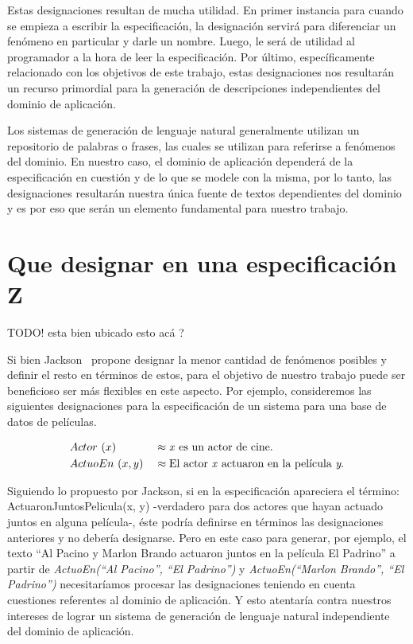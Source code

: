 Estas designaciones resultan de mucha utilidad. En primer instancia para cuando se empieza a escribir la especificación, la designación servirá para diferenciar un fenómeno en particular y darle un nombre. Luego, le será de utilidad al programador a la hora de leer la especificación. Por último, específicamente relacionado con los objetivos de este trabajo, estas designaciones nos resultarán un recurso primordial para la generación de descripciones independientes del dominio de aplicación.

Los sistemas de generación de lenguaje natural generalmente utilizan un repositorio de palabras o frases, las cuales se utilizan para referirse a fenómenos del dominio. En nuestro caso, el dominio de aplicación dependerá de la especificación en cuestión y de lo que se modele con la misma, por lo tanto, las designaciones resultarán nuestra única fuente de textos dependientes del dominio y es por eso que serán un elemento fundamental para nuestro trabajo.

\section{Que designar en una especificación Z}

TODO! esta bien ubicado esto acá ?

Si bien Jackson~\cite{jackson} propone designar la menor cantidad de fenómenos posibles y definir el resto en términos de estos, para el objetivo de nuestro trabajo puede ser beneficioso ser más flexibles en este aspecto. Por ejemplo, consideremos las siguientes designaciones para la especificación de un sistema para una base de datos de películas.

\begin{figure}[H]
  \begin{align*} 
    &Actor~(x) && \approx \text{\emph{x} es un actor de cine.} \\
    &ActuoEn~(x, y) && \approx \text{El actor \emph{x} actuaron en la película \emph{y}.} \\
  \end{align*}
  \label{fig:ej_peliculas}
\end{figure}

Siguiendo lo propuesto por Jackson, si en la especificación apareciera el término: ActuaronJuntosPelicula(x, y) -verdadero para dos actores que hayan actuado juntos en alguna película-, éste podría definirse en términos las designaciones anteriores y no debería designarse. Pero en este caso para generar, por ejemplo, el texto ``Al Pacino y Marlon Brando actuaron juntos en la película El Padrino'' a partir de \emph{ActuoEn(``Al Pacino'', ``El Padrino'')} y \emph{ActuoEn(``Marlon Brando'', ``El Padrino'')} necesitaríamos procesar las designaciones teniendo en cuenta cuestiones referentes al dominio de aplicación. Y esto atentaría contra nuestros intereses de lograr un sistema de generación de lenguaje natural independiente del dominio de aplicación.


